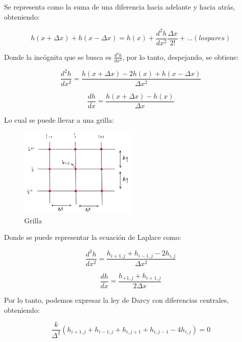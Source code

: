 Se representa como la suma de una diferencia hacia adelante y hacia atrás, obteniendo:

\begin{equation}
    h(x + \Delta x) + h(x - \Delta x) = h(x) + \frac{d^2h}{dx^2}\frac{\Delta x}{2!} + ...(los pares)
\end{equation}

Donde la incógnita que se busca es $\frac{d^2h}{dx^2}$, por lo tanto, despejando, se obtiene:

\begin{equation}
    \frac{d^2h}{dx^2} = \frac{h(x + \Delta x) - 2h(x) + h(x - \Delta x)}{\Delta x^2}
\end{equation}

\begin{equation}
    \frac{dh}{dx} = \frac{h(x + \Delta x) - h(x)}{\Delta x}
\end{equation}

Lo cual se puede llevar a una grilla:

\begin{figure}[H]
    \centering
    \includegraphics[width=0.5\textwidth]{FOTOS/grilla.jpg}
    \caption{Grilla}
\end{figure}

Donde se puede representar la ecuación de Laplace como:

\begin{equation}
    \frac{d^2h}{dx^2} = \frac{h_{i+1,j} + h_{i-1,j} - 2h_{i,j}}{\Delta x^2}
\end{equation}

\begin{equation}
    \frac{dh}{dx} = \frac{h_{+1,j} + h_{i+1,j}}{2\Delta x}
\end{equation}

Por lo tanto, podemos expresar la ley de Darcy con diferencias centrales, obteniendo:

\begin{equation}
    \frac{k}{\Delta^2}(h_{i+1,j} + h_{i-1,j} + h_{i,j+1} + h_{i,j-1} - 4h_{i,j}) = 0
\end{equation}

